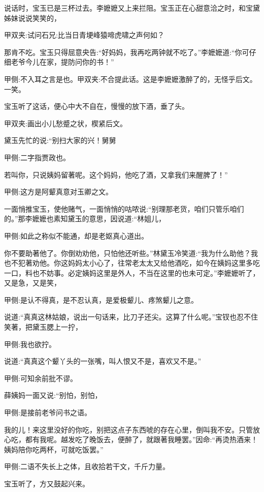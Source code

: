 \begin{parag}
    说话时，宝玉已是三杯过去。李嬷嬷又上来拦阻。宝玉正在心甜意洽之时，和宝黛姊妹说说笑笑的，\begin{note}甲双夹:试问石兄:比当日青埂峰猿啼虎啸之声何如？\end{note}那肯不吃。宝玉只得屈意央告:“好妈妈，我再吃两钟就不吃了。”李嬷嬷道:“你可仔细老爷今儿在家，提防问你的书！”\begin{note}甲侧:不入耳之言是也。甲双夹:不合提此话。这是李嬷嬷激醉了的，无怪乎后文。一笑。\end{note}宝玉听了这话，便心中大不自在，慢慢的放下酒，垂了头。\begin{note}甲双夹:画出小儿愁蹙之状，楔紧后文。\end{note}黛玉先忙的说:“别扫大家的兴！舅舅\begin{note}甲侧:二字指贾政也。\end{note}若叫你，只说姨妈留著呢。这个妈妈，他吃了酒，又拿我们来醒脾了！”\begin{note}甲侧:这方是阿颦真意对玉卿之文。\end{note}一面悄推宝玉，使他赌气，一面悄悄的咕哝说:“别理那老货，咱们只管乐咱们的。”那李嬷嬷也素知黛玉的意思，因说道:“林姐儿，\begin{note}甲侧:如此之称似不能通，却是老妪真心道出。\end{note}你不要助著他了。你倒劝劝他，只怕他还听些。”林黛玉冷笑道:“我为什么助他？我也不犯著劝他。你这妈妈太小心了，往常老太太又给他酒吃，如今在姨妈这里多吃一口，料也不妨事。必定姨妈这里是外人，不当在这里的也未可定。”李嬷嬷听了，又是急，又是笑，\begin{note}甲侧:是认不得真，是不忍认真，是爱极颦儿、疼煞颦儿之意。\end{note}说道:“真真这林姑娘，说出一句话来，比刀子还尖。这算了什么呢。”宝钗也忍不住笑著，把黛玉腮上一拧，\begin{note}甲侧:我也欲拧。\end{note}说道:“真真这个颦丫头的一张嘴，叫人恨又不是，喜欢又不是。”\begin{note}甲侧:可知余前批不谬。\end{note}薛姨妈一面又说:“别怕，别怕，\begin{note}甲侧:是接前老爷问书之语。\end{note}我的儿！来这里没好的你吃，别把这点子东西唬的存在心里，倒叫我不安。只管放心吃，都有我呢。越发吃了晚饭去，便醉了，就跟著我睡罢。”因命:“再烫热酒来！姨妈陪你吃两杯，可就吃饭罢。”\begin{note}甲侧:二语不失长上之体，且收拾若干文，千斤力量。\end{note}宝玉听了，方又鼓起兴来。
\end{parag}


